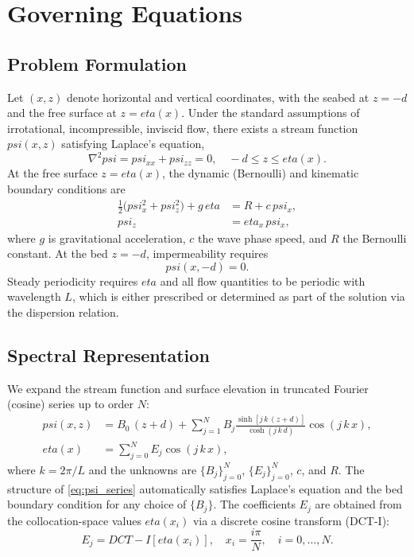 \documentclass[journal,10pt,twocolumn]{IEEEtran}
\def\eta{eta}%
\def\psi{psi}%
\def\mathrm#1{#1}%
\def\text#1{#1}%
\def\;{ }%
\newcommand{\half}{\tfrac{1}{2}}
\begin{document}
\section{Governing Equations}
\label{sec:fenton_method}

\subsection{Problem Formulation}

Let $(x,z)$ denote horizontal and vertical coordinates, with the
seabed at $z = -d$ and the free surface at $z = \eta(x)$.
Under the standard assumptions of irrotational, incompressible,
inviscid flow, there exists a stream function $\psi(x,z)$ satisfying
Laplace's equation,
\begin{equation}
    \nabla^2\psi = \psi_{xx} + \psi_{zz} = 0,
    \quad -d \le z \le \eta(x).
\end{equation}
At the free surface $z = \eta(x)$, the dynamic (Bernoulli) and
kinematic boundary conditions are
\begin{align}
    \half\bigl(\psi_x^2 + \psi_z^2\bigr) + g\,\eta
    &= R + c\,\psi_x,
    \label{eq:bernoulli}\\
    \psi_z &= \eta_x\,\psi_x,
    \label{eq:kinematic}
\end{align}
where $g$ is gravitational acceleration, $c$ the wave phase speed,
and $R$ the Bernoulli constant.
At the bed $z = -d$, impermeability requires
\begin{equation}
    \psi(x,-d) = 0.
\end{equation}
Steady periodicity requires $\eta$ and all flow quantities to be
periodic with wavelength $L$, which is either prescribed or determined
as part of the solution via the dispersion relation.

\subsection{Spectral Representation}
\label{sec:spectral}

We expand the stream function and surface elevation in truncated
Fourier (cosine) series up to order $N$:
\begin{align}
    \psi(x,z) &= B_0\,(z+d)
    + \sum_{j=1}^{N} B_j\;
    \frac{\sinh[j\,k\,(z+d)]}{\cosh(j\,k\,d)}
    \cos(j\,k\,x),
    \label{eq:psi_series}\\
    \eta(x) &= \sum_{j=0}^{N} E_j\;\cos(j\,k\,x),
    \label{eq:eta_series}
\end{align}
where $k = 2\pi/L$ and the unknowns are
$\{B_j\}_{j=0}^N$, $\{E_j\}_{j=0}^N$, $c$, and $R$.
The structure of \eqref{eq:psi_series} automatically satisfies
Laplace's equation and the bed boundary condition for any choice of
$\{B_j\}$.
The coefficients $E_j$ are obtained from the collocation-space values
$\eta(x_i)$ via a discrete cosine transform (DCT-I):
\begin{equation}
    E_j = \mathrm{DCT\text{-}I}[\eta(x_i)],
    \quad x_i = \frac{i\pi}{N},\quad i = 0,\dots,N.
\end{equation}
\end{document}
